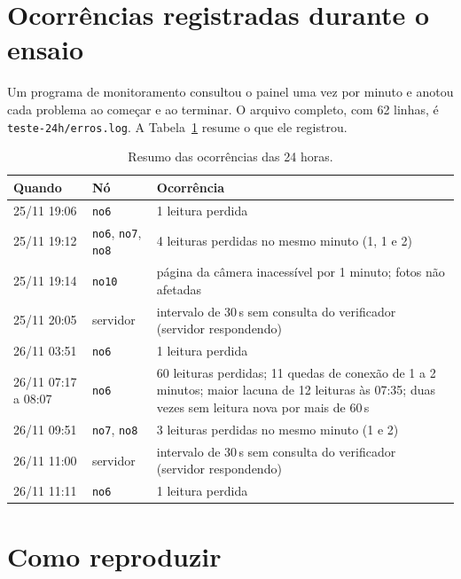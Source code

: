 \documentclass[11pt,a4paper]{article}
\newcommand{\no}[1]{\texttt{#1}}
\begin{document}


\section{Ocorrências registradas durante o ensaio}
\label{sec:ocorrencias}

Um programa de monitoramento consultou o painel uma vez por minuto e anotou cada problema ao começar e ao terminar. O arquivo completo, com 62 linhas, é \texttt{teste-24h/erros.log}. A Tabela~\ref{tab:ocorrencias} resume o que ele registrou.

\begin{table}[H]
\centering\small
\begin{tabularx}{\linewidth}{@{}llX@{}}
\toprule
\textbf{Quando} & \textbf{Nó} & \textbf{Ocorrência} \\
\midrule
25/11 19:06 & \no{no6} & 1 leitura perdida \\
25/11 19:12 & \no{no6}, \no{no7}, \no{no8} & 4 leituras perdidas no mesmo minuto (1, 1 e 2) \\
25/11 19:14 & \no{no10} & página da câmera inacessível por 1 minuto; fotos não afetadas \\
25/11 20:05 & servidor & intervalo de 30\,s sem consulta do verificador (servidor respondendo) \\
26/11 03:51 & \no{no6} & 1 leitura perdida \\
26/11 07:17 a 08:07 & \no{no6} & 60 leituras perdidas; 11 quedas de conexão de 1 a 2 minutos; maior lacuna de 12 leituras às 07:35; duas vezes sem leitura nova por mais de 60\,s \\
26/11 09:51 & \no{no7}, \no{no8} & 3 leituras perdidas no mesmo minuto (1 e 2) \\
26/11 11:00 & servidor & intervalo de 30\,s sem consulta do verificador (servidor respondendo) \\
26/11 11:11 & \no{no6} & 1 leitura perdida \\
\bottomrule
\end{tabularx}
\caption{Resumo das ocorrências das 24 horas.}
\label{tab:ocorrencias}
\end{table}

\section{Como reproduzir}
\end{document}
